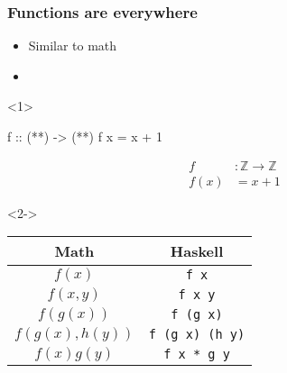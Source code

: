 \documentclass[17pt]{beamer}
\renewcommand{\(}[1]{\begin{columns}[#1]}
\renewcommand{\)}{\end{columns}}
\newcommand{\<}[1]{\begin{column}{#1}}
\renewcommand{\>}{\end{column}}
\begin{document}
\begin{frame}[fragile]
  \frametitle{Functions are everywhere}
  \begin{minipage}[t][.2\textheight]{\textwidth}
    \begin{itemize}
    \item Similar to math
    \item<3-> 
  \end{itemize}
  \end{minipage}
  \begin{minipage}[c][.5\textheight]{\textwidth}
  \begin{center}
    \begin{onlyenv}<1>
      \begin{code}
f :: (**) -> (**)
f x = x + 1
      \end{code}
      \begin{align*}
        f    &: \mathbb{Z} \rightarrow \mathbb{Z}\\
        f(x) &= x + 1
      \end{align*}
    \end{onlyenv}
    \begin{onlyenv}<2->
      \begin{tabular}{ c | c }
        Math & Haskell \\\hline
        $f(x)$ & \texttt{f x} \\
        $f(x, y)$ & \texttt{f x y} \\
        $f(g(x))$ & \texttt{f (g x)} \\
        $f(g(x), h(y))$ & \texttt{f (g x) (h y)} \\
        $f(x) g(y)$ & \texttt{f x * g y}
      \end{tabular}
    \end{onlyenv}
  \end{center}
  \end{minipage}
\end{frame}
\end{document}
